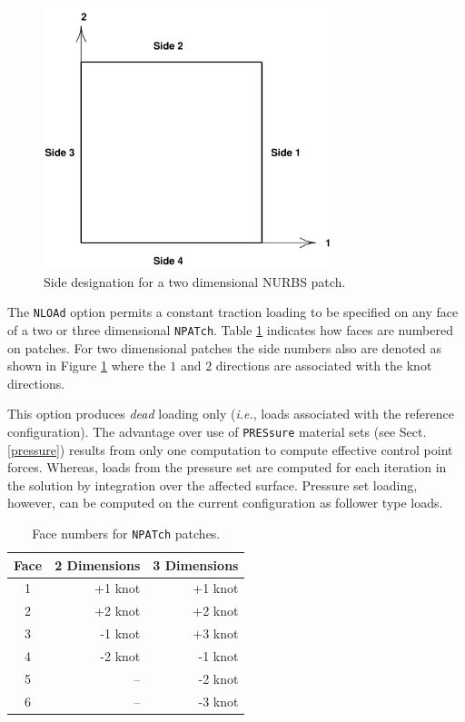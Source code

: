 \begin{figure}[b!]
\begin{center}

\includegraphics[height=3in]{figs/nside2d}

\caption{Side designation for a two dimensional NURBS patch. \label{fig3a} }
\end{center}
\end{figure}

The  \texttt{NLOAd} option permits a constant traction loading to be
specified on
any face of a two or three dimensional \texttt{NPATch}. Table \ref{tab2.1}
indicates how faces are numbered on patches.
For two dimensional patches the side numbers also are denoted as shown in
Figure \ref{fig3a} where the $1$ and $2$ directions are associated with the
knot directions.

This option produces \textit{dead} loading only (\textit{i.e.}, loads associated
with the reference configuration). The advantage over use of \texttt{PRESsure}
material sets (see Sect. \ref{pressure}) results from only one computation to
compute effective control point forces. Whereas, loads from the pressure
set are computed for each iteration in the solution by integration over the
affected surface.  Pressure set loading, however, can be computed on the
current configuration as follower type loads.

\begin{table}[h]
\begin{center}
\begin{tabular}{|c || r | r |} \hline
Face & \multicolumn{1}{c|}{2 Dimensions} & \multicolumn{1}{c|}{3 Dimensions} \\ \hline
1 & +1 knot & +1 knot \\
2 & +2 knot & +2 knot \\
3 & -1 knot & +3 knot \\
4 & -2 knot & -1 knot \\
5 & -- & -2 knot \\
6 & -- & -3 knot \\ \hline
\end{tabular}
\caption{Face numbers for \texttt{NPATch} patches. \label{tab2.1} }
\end{center}
\end{table}

